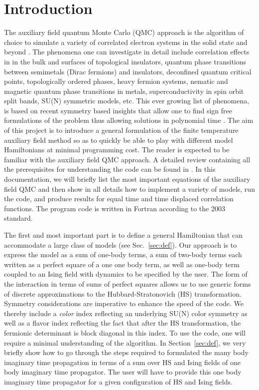 \section{Introduction}\label{sec:intro}


The auxiliary field quantum Monte Carlo (QMC) approach is the algorithm of choice to simulate a variety of correlated electron systems in the solid state and beyond \cite{Blankenbecler81,Assaad08_rev}.  The phenomena  one can investigate in detail include correlation effects in in the bulk and surfaces of topological insulators, quantum phase transitions between semimetals (Dirac fermions)  and insulators,  deconfined quantum critical points, topologically ordered phases, heavy fermion systems, nematic and magnetic quantum phase transitions in metals,   superconductivity in spin orbit split bands, SU(N) symmetric models,  etc.  This ever growing list of phenomena,  is based on  recent symmetry based insights that allow one to  find  sign free formulations of the  problem thus allowing solutions in polynomial time \cite{Wu04,Wei16}.   The aim of this project is to introduce a general formulation of the finite temperature  auxiliary field method  so as to quickly be able to play with different model Hamiltonians  at  minimal programming cost.      The reader is expected to be familiar with the auxiliary field QMC  approach. A detailed review containing all  the prerequisites for understanding  the code can be found in \cite{Assaad08_rev}.    In this documentation, we will briefly list the most important equations of the auxiliary field QMC and then show in all details how to implement a variety of models, run the code, and produce  results for  equal time and time displaced correlation functions. 
The program code is written in Fortran according to the 2003 standard. 

The first and most important  part is to define a general Hamiltonian  that  can  accommodate a large class of models  (see Sec.~\ref{sec:def}). Our approach is to express the model as a sum of one-body terms, a sum of two-body terms each written as a perfect square of a one one body term, as well as one-body  term  coupled to an Ising field with  dynamics to be specified by the user.   
The form of the interaction in terms of sums of perfect squares allows us to use generic forms of  discrete  approximations to the  Hubbard-Stratonovich (HS)  transformation. 	 Symmetry considerations  are  imperative to enhance the speed of the code.   We thereby include a {\it color} index  reflecting  an underlying  SU(N) color symmetry as  well as a flavor index  reflecting  the fact that  after  the HS  transformation,  the  fermionic determinant is block diagonal in this index.    To use the code, one will require a minimal understanding of the algorithm.  In Section~\ref{sec:def}, we very briefly show how to go through  the steps required  to formulated the many body imaginary time propagation in terms of a sum  over HS and Ising fields  of one body  imaginary time propagator.   The user will have to provide this one body imaginary time propagator for a given configuration of   HS and  Ising fields.   
	  
